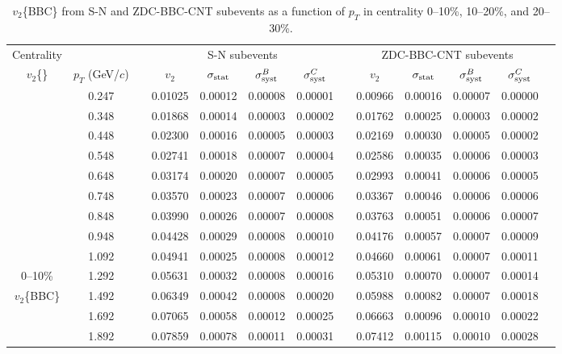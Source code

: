 \documentclass[aps,prc,superscriptaddress,showpacs,floatfix,twocolumn]{revtex4}
\newcommand \gevc{GeV/$c$\xspace}
\newcommand \pt{\mbox{$p_T$}\xspace}
\begin{document}
\begin{table}[htbp]
\caption{\label{tab:table_v2bbc_cent0-30}
$v_2$\{BBC\} from S-N and ZDC-BBC-CNT subevents as a function of \pt in centrality 
0--10\%, 10--20\%, and 20--30\%.
}
\begingroup \squeezetable
\begin{ruledtabular} \begin{tabular}{c|cccccccccccc}
Centrality
 & & & \multicolumn{4}{c}{S-N subevents} & & \multicolumn{4}{c}{ZDC-BBC-CNT subevents} \\ 
$v_2$\{\}
 &$\pt$ (\gevc) & & $v_2$ & $\sigma_{\rm stat}$ & $\sigma_{\rm syst}^B$ & $\sigma_{\rm syst}^C$ 
& & $v_2$ & $\sigma_{\rm stat}$ & $\sigma_{\rm syst}^B$ & $\sigma_{\rm syst}^C$ \\ 
\hline
 & 0.247 && 0.01025 & 0.00012 & 0.00008 & 0.00001 & & 0.00966 & 0.00016 & 0.00007 & 0.00000 \\ 
 & 0.348 && 0.01868 & 0.00014 & 0.00003 & 0.00002 & & 0.01762 & 0.00025 & 0.00003 & 0.00002 \\ 
 & 0.448 && 0.02300 & 0.00016 & 0.00005 & 0.00003 & & 0.02169 & 0.00030 & 0.00005 & 0.00002 \\ 
 & 0.548 && 0.02741 & 0.00018 & 0.00007 & 0.00004 & & 0.02586 & 0.00035 & 0.00006 & 0.00003 \\ 
 & 0.648 && 0.03174 & 0.00020 & 0.00007 & 0.00005 & & 0.02993 & 0.00041 & 0.00006 & 0.00005 \\ 
 & 0.748 && 0.03570 & 0.00023 & 0.00007 & 0.00006 & & 0.03367 & 0.00046 & 0.00006 & 0.00006 \\ 
 & 0.848 && 0.03990 & 0.00026 & 0.00007 & 0.00008 & & 0.03763 & 0.00051 & 0.00006 & 0.00007 \\ 
 & 0.948 && 0.04428 & 0.00029 & 0.00008 & 0.00010 & & 0.04176 & 0.00057 & 0.00007 & 0.00009 \\ 
 & 1.092 && 0.04941 & 0.00025 & 0.00008 & 0.00012 & & 0.04660 & 0.00061 & 0.00007 & 0.00011 \\ 
0--10\%
 & 1.292 && 0.05631 & 0.00032 & 0.00008 & 0.00016 & & 0.05310 & 0.00070 & 0.00007 & 0.00014 \\ 
$v_2$\{BBC\}
 & 1.492 && 0.06349 & 0.00042 & 0.00008 & 0.00020 & & 0.05988 & 0.00082 & 0.00007 & 0.00018 \\ 
 & 1.692 && 0.07065 & 0.00058 & 0.00012 & 0.00025 & & 0.06663 & 0.00096 & 0.00010 & 0.00022 \\ 
 & 1.892 && 0.07859 & 0.00078 & 0.00011 & 0.00031 & & 0.07412 & 0.00115 & 0.00010 & 0.00028 \\ 

\end{tabular}
\end{ruledtabular}
\end{table}
\end{document}

